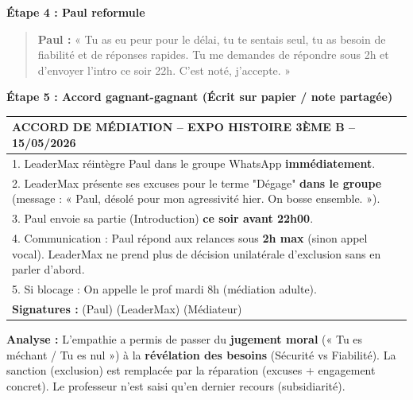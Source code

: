 \documentclass[11pt]{article}
\newcommand{\cle}[1]{{\popxbold\color{popdark}#1}}
\begin{document}
\begin{exoresolu}
\textbf{Étape 4 : Paul reformule}
\begin{quote}
\textbf{Paul :} « Tu as eu peur pour le délai, tu te sentais seul, tu as besoin de fiabilité et de réponses rapides. Tu me demandes de répondre sous 2h et d'envoyer l'intro ce soir 22h. C'est noté, j'accepte. »
\end{quote}

\textbf{Étape 5 : Accord gagnant-gagnant (Écrit sur papier / note partagée)}
\begin{center}
\begin{tabularx}{\linewidth}{|X|}
\hline
\textbf{ACCORD DE MÉDIATION -- EXPO HISTOIRE 3ÈME B -- 15/05/2026} \\
\hline
1. LeaderMax réintègre Paul dans le groupe WhatsApp \textbf{immédiatement}. \\
2. LeaderMax présente ses excuses pour le terme "Dégage" \textbf{dans le groupe} (message : « Paul, désolé pour mon agressivité hier. On bosse ensemble. »). \\
3. Paul envoie sa partie (Introduction) \textbf{ce soir avant 22h00}. \\
4. Communication : Paul répond aux relances sous \textbf{2h max} (sinon appel vocal). LeaderMax ne prend plus de décision unilatérale d'exclusion sans en parler d'abord. \\
5. Si blocage : On appelle le prof mardi 8h (médiation adulte). \\
\hline
\textbf{Signatures :} \hrulefill (Paul) \quad \hrulefill (LeaderMax) \quad \hrulefill (Médiateur) \\
\hline
\end{tabularx}
\end{center}

\textbf{Analyse :} L'empathie a permis de passer du \textbf{jugement moral} (« Tu es méchant / Tu es nul ») à la \textbf{révélation des besoins} (Sécurité vs Fiabilité). La sanction (exclusion) est remplacée par la \cle{réparation} (excuses + engagement concret). Le professeur n'est saisi qu'en dernier recours (subsidiarité).
\end{exoresolu}
\end{document}
